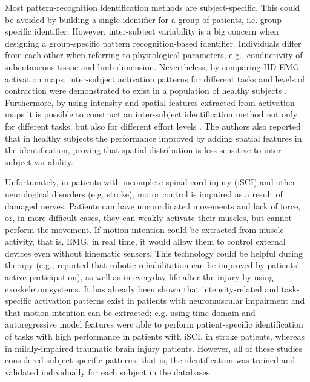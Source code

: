 Most pattern-recognition identification methods are subject-specific. This could be avoided by building a single identifier for a group of patients, i.e. group-specific identifier. However, inter-subject variability is a big concern when designing a group-specific pattern recognition-based identifier. Individuals differ from each other when referring to physiological parameters, e.g., conductivity of subcutaneous tissue and limb dimension. Nevertheless, by comparing HD-EMG activation maps, inter-subject activation patterns for different tasks and levels of contraction were demonstrated to exist in a population of healthy subjects \citep{Rojas-Martinez2012}. Furthermore, by using intensity and spatial features extracted from activation maps it is possible to construct an inter-subject identification method not only for different tasks, but also for different effort levels \citep{Rojas-Martinez2013}. The authors also reported that in healthy subjects the performance improved by adding spatial features in the identification, proving that spatial distribution is less sensitive to inter-subject variability.

Unfortunately, in patients with incomplete spinal cord injury (iSCI) and other neurological disorders (e.g. stroke), motor control is impaired as a result of damaged nerves. Patients can have uncoordinated movements and lack of force, or, in more difficult cases, they can weakly activate their muscles, but cannot perform the movement. If motion intention could be extracted from muscle activity, that is, EMG, in real time, it would allow them to control external devices even without kinematic sensors. This technology could be helpful during therapy (e.g., \citet{Hogan2006} reported that robotic rehabilitation can be improved by patients’ active participation), as well as in everyday life after the injury by using exoskeleton systems. It has already been shown that intensity-related and task-specific activation patterns exist in patients with neuromuscular impairment and that motion intention can be extracted; e.g. using time domain and autoregressive model features \citet{Liu2013} were able to perform patient-specific identification of tasks with high performance in patients with iSCI, \citet{Zhang2012} in stroke patients, whereas \citet{Geng2014} in mildly-impaired traumatic brain injury patients. However, all of these studies considered subject-specific patterns, that is, the identification was trained and validated individually for each subject in the databases.

